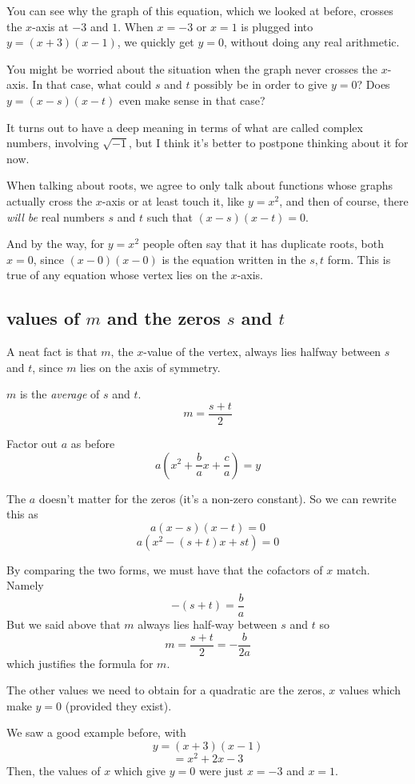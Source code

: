 \documentclass[11pt, oneside]{article}
\begin{document}
You can see why the graph of this equation, which we looked at before, crosses the $x$-axis at $-3$ and $1$.  When $x = -3$ or $x = 1$ is plugged into $y = (x + 3)(x - 1)$, we quickly get $y = 0$, without doing any real arithmetic.

You might be worried about the situation when the graph never crosses the $x$-axis. In that case, what could $s$ and $t$ possibly be in order to give $y = 0$?  Does $y = (x - s)(x - t)$ even make sense in that case?  

It turns out to have a deep meaning in terms of what are called complex numbers, involving $\sqrt{-1}$, but I think it's better to postpone thinking about it for now.  

When talking about roots, we agree to only talk about functions whose graphs actually cross the $x$-axis or at least touch it, like $y =x^2$, and then of course, there \emph{will be} real numbers $s$ and $t$ such that $(x - s)(x - t) = 0$.

And by the way, for $y = x^2$ people often say that it has duplicate roots, both $x = 0$, since $(x - 0)(x - 0)$ is the equation written in the $s,t$ form.  This is true of any equation whose vertex lies on the $x$-axis.

\subsection*{values of $m$ and the zeros $s$ and $t$}

A neat fact is that $m$, the $x$-value of the vertex, always lies halfway between $s$ and $t$, since $m$ lies on the axis of symmetry.

$m$ is the \emph{average} of $s$ and $t$.
\[ m = \frac{s + t}{2} \]

Factor out $a$ as before
\[ a(x^2 + \frac{b}{a} x + \frac{c}{a}) = y \]

The $a$ doesn't matter for the zeros (it's a non-zero constant).  So we can rewrite this as
\[ a(x - s)(x - t) = 0 \]
\[ a(x^2 - (s + t)x + st) = 0 \]

By comparing the two forms, we must have that the cofactors of $x$ match.  Namely
\[ -(s + t) = \frac{b}{a} \]
But we said above that $m$ always lies half-way between $s$ and $t$ so
\[ m = \frac{s + t}{2} = - \frac{b}{2a} \]
which justifies the formula for $m$.

The other values we need to obtain for a quadratic are the zeros, $x$ values which make $y = 0$ (provided they exist).

We saw a good example before, with
\[ y = (x + 3)(x - 1) \]
\[ = x^2 + 2x - 3 \]
Then, the values of $x$ which give $y = 0$ were just $x = -3$ and $x = 1$.  
\end{document}
